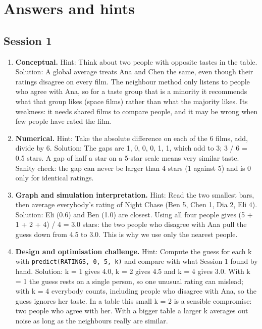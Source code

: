 \documentclass[11pt,a4paper]{article}
\begin{document}
\section{Answers and hints}

\subsection*{Session 1}
\begin{enumerate}[nosep]
\item \textbf{Conceptual.} Hint: Think about two people with opposite tastes in the table. Solution: A global average treats Ana and Chen the same, even though their ratings disagree on every film. The neighbour method only listens to people who agree with Ana, so for a taste group that is a minority it recommends what that group likes (space films) rather than what the majority likes. Its weakness: it needs shared films to compare people, and it may be wrong when few people have rated the film.
\item \textbf{Numerical.} Hint: Take the absolute difference on each of the 6 films, add, divide by 6. Solution: The gaps are 1, 0, 0, 0, 1, 1, which add to 3; 3 / 6 = 0.5 stars. A gap of half a star on a 5-star scale means very similar taste. Sanity check: the gap can never be larger than 4 stars (1 against 5) and is 0 only for identical ratings.
\item \textbf{Graph and simulation interpretation.} Hint: Read the two smallest bars, then average everybody's rating of Night Chase (Ben 5, Chen 1, Dia 2, Eli 4). Solution: Eli (0.6) and Ben (1.0) are closest. Using all four people gives (5 + 1 + 2 + 4) / 4 = 3.0 stars: the two people who disagree with Ana pull the guess down from 4.5 to 3.0. This is why we use only the nearest people.
\item \textbf{Design and optimisation challenge.} Hint: Compute the guess for each k with \texttt{predict(RATINGS, 0, 5, k)} and compare with what Session 1 found by hand. Solution: k = 1 gives 4.0, k = 2 gives 4.5 and k = 4 gives 3.0. With k = 1 the guess rests on a single person, so one unusual rating can mislead; with k = 4 everybody counts, including people who disagree with Ana, so the guess ignores her taste. In a table this small k = 2 is a sensible compromise: two people who agree with her. With a bigger table a larger k averages out noise as long as the neighbours really are similar.
\end{enumerate}
\end{document}
